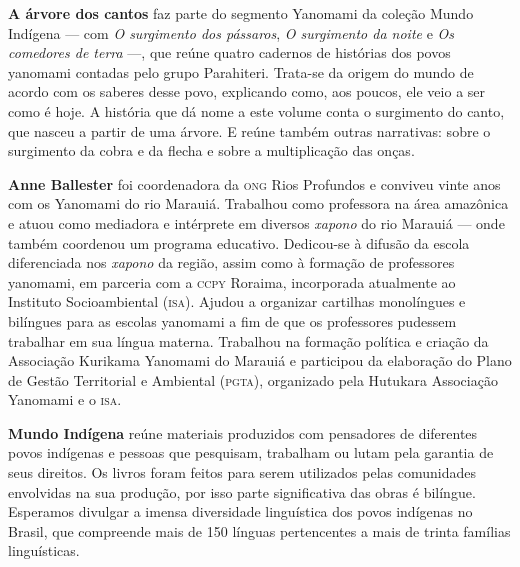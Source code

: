 \textbf{A árvore dos cantos} faz parte do segmento Yanomami da coleção Mundo Indígena --- com \textit{O surgimento dos pássaros}, \textit{O surgimento da noite} e \textit{Os comedores de terra} ---, que reúne quatro cadernos de histórias dos povos yanomami contadas pelo grupo Parahiteri. Trata-se da origem do mundo de acordo com os saberes desse povo, explicando como, aos poucos, ele veio a ser como é hoje. A história que dá nome a este volume conta o surgimento do canto, que nasceu a partir de uma árvore. E reúne também outras narrativas: sobre o surgimento da cobra e da flecha e sobre a multiplicação das onças. 

\textbf{Anne Ballester} foi coordenadora da \textsc{ong} Rios Profundos e conviveu vinte anos com os Yanomami do rio Marauiá. Trabalhou como professora na área amazônica e atuou como mediadora e intérprete em diversos \textit{xapono} do rio Marauiá --- onde também coordenou um programa educativo. Dedicou-se à difusão da escola diferenciada nos \textit{xapono} da região, assim como à formação de professores yanomami, em parceria com a \textsc{ccpy} Roraima, incorporada atualmente ao Instituto Socioambiental (\textsc{isa}). Ajudou a organizar cartilhas monolíngues e bilíngues para as escolas yanomami a fim de que os professores pudessem trabalhar em sua língua materna. Trabalhou na formação política e criação da Associação Kurikama Yanomami do Marauiá e participou da elaboração do Plano de Gestão Territorial e Ambiental (\textsc{pgta}), organizado pela Hutukara Associação Yanomami e o \textsc{isa}.

\textbf{Mundo Indígena} reúne materiais produzidos com pensadores de diferentes povos indígenas e pessoas que pesquisam, trabalham ou lutam pela garantia de seus direitos. Os livros foram feitos para serem utilizados pelas comunidades envolvidas na sua produção, por isso parte significativa das obras é bilíngue. Esperamos divulgar a imensa diversidade linguística dos povos indígenas no Brasil, que compreende mais de 150 línguas pertencentes a mais de trinta famílias linguísticas.



